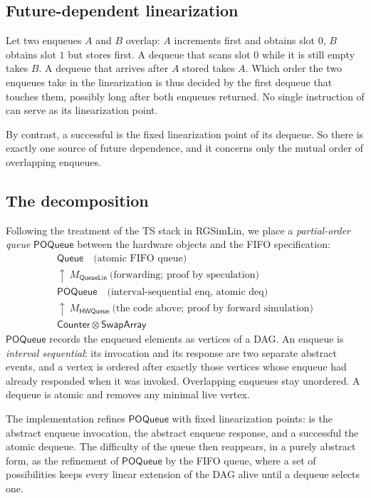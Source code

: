 \documentclass[11pt]{article}
\theoremstyle{definition}
\theoremstyle{remark}
\newcommand{\code}[1]{\texttt{\detokenize{#1}}}
\newcommand{\Counter}{\mathsf{Counter}}
\newcommand{\SwapArray}{\mathsf{SwapArray}}
\newcommand{\POQueue}{\mathsf{POQueue}}
\newcommand{\Queue}{\mathsf{Queue}}
\newcommand{\HWQ}{\mathsf{HWQueue}}
\newcommand{\QLin}{\mathsf{QueueLin}}
\begin{document}
\subsection{Future-dependent linearization}

Let two enqueues $A$ and $B$ overlap: $A$ increments first and obtains slot
$0$, $B$ obtains slot $1$ but stores first.  A dequeue that scans slot $0$
while it is still empty takes $B$.  A dequeue that arrives after $A$ stored
takes $A$.  Which order the two enqueues take in the linearization is thus
decided by the first dequeue that touches them, possibly long after both
enqueues returned.  No single instruction of \code{enq} can serve as its
linearization point.

By contrast, a successful \code{swap} is the fixed linearization point of
its dequeue.  So there is exactly one source of future dependence, and it
concerns only the mutual order of overlapping enqueues.

\subsection{The decomposition}

Following the treatment of the TS stack in RGSimLin, we place a
\emph{partial-order queue} $\POQueue$ between the hardware objects and the
FIFO specification:
\[
\begin{array}{c}
\Queue \quad\text{(atomic FIFO queue)}\\[-2pt]
\uparrow\ M_{\QLin}\ \text{(forwarding; proof by speculation)}\\[-2pt]
\POQueue \quad\text{(interval-sequential enq, atomic deq)}\\[-2pt]
\uparrow\ M_{\HWQ}\ \text{(the code above; proof by forward simulation)}\\[-2pt]
\Counter \otimes \SwapArray
\end{array}
\]
$\POQueue$ records the enqueued elements as vertices of a DAG.  An enqueue is
\emph{interval sequential}: its invocation and its response are two separate
abstract events, and a vertex is ordered after exactly those vertices whose
enqueue had already responded when it was invoked.  Overlapping enqueues stay
unordered.  A dequeue is atomic and removes any minimal live vertex.

The implementation refines $\POQueue$ with fixed linearization points:
\code{inc} is the abstract enqueue invocation, \code{store} the abstract
enqueue response, and a successful \code{swap} the atomic dequeue.  The
difficulty of the queue then reappears, in a purely abstract form, as the
refinement of $\POQueue$ by the FIFO queue, where a set of possibilities keeps
every linear extension of the DAG alive until a dequeue selects one.
\end{document}
